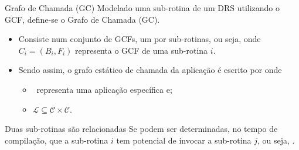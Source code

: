    \begin{frame}{Grafo de Chamada (GC)}
      Modelado uma sub-rotina de um DRS utilizando o GCF, define-se o Grafo de Chamada (GC).

      \begin{itemize}
         \setlength{\itemsep}{0.6em}
         \item Consiste num conjunto de GCFs, um por sub-rotinas, ou seja, 
         onde $ C_i = (B_i, F_i) $ representa o GCF de uma sub-rotina $ i $.

         \item Sendo assim, o grafo estático de chamada da aplicação é escrito por  onde
         \begin{itemize}
            \item \A\ representa uma aplicação específica e;
            \item $ \mathcal{L} \subseteq \mathcal{C} \times \mathcal{C} $.
         \end{itemize}

      \end{itemize}

      \begin{block}{Duas sub-rotinas são relacionadas}
         Se podem ser determinadas, no tempo de compilação, que a sub-rotina $ i $ tem potencial de invocar a sub-rotina $ j $, ou seja, .
      \end{block}
   \end{frame}


